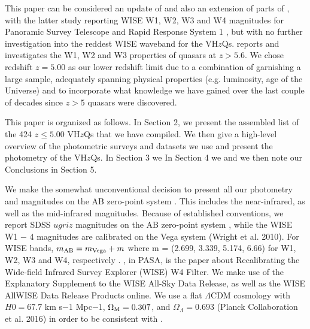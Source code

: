\documentclass[usenatbib]{mnras}
\begin{document}
This paper can be considered an update of \citet{Blain2013} and also
an extension of parts of \citet{Banados2016}, with the latter study
reporting WISE W1, W2, W3 and W4 magnitudes for Panoramic Survey
Telescope and Rapid Response System 1 \citep[Pan-STARRS1,
PS1;][]{Kaiser2002, Kaiser2010}, but with no further investigation
into the reddest WISE waveband for the VH$z$Qs.  \citet{Banados2016}
reports and investigates the W1, W2 and W3 properties of quasars at $z
> 5.6$. We chose redshift $z=5.00$ as our lower redshift limit due to
a combination of garnishing a large sample, adequately spanning
physical properties (e.g. luminosity, age of the Universe) and to
incorporate what knowledge we have gained over the last couple of
decades since $z>5$ quasars were discovered.

This paper is organized as follows.  In Section 2, we present the
assembled list of the 424 $z\leq5.00$ VH$z$Qs that we have
compiled. We then give a high-level overview of the photometric
surveys and datasets we use and present the photometry of the VH$z$Qs.
In Section 3 we In Section 4 we and we then note our Conclusions in
Section 5.

We make the somewhat unconventional decision to present all our
photometry and magnitudes on the AB zero-point system
\citep{Oke_Gunn1983, Fukugita1996}.  This includes the near-infrared,
as well as the mid-infrared magnitudes.  Because of established
conventions, we report SDSS $ugriz$ magnitudes on the AB zero-point
system \citep{Oke_Gunn1983, Fukugita1996}, while the WISE W1 − 4
magnitudes are calibrated on the Vega system (Wright et al. 2010). For
WISE bands, $m_{\rm AB} = m_{\rm Vega} + m$ where m = (2.699, 3.339,
5.174, 6.66) for W1, W2, W3 and W4, respectively \citep{Cutri2011,
Brown2014b}. \citet{Brown2014b}, in PASA, is the paper about
Recalibrating the Wide-field Infrared Survey Explorer (WISE) W4
Filter. We make use of the Explanatory Supplement to the WISE All-Sky
Data Release, as well as the WISE AllWISE Data Release Products
online.  We use a flat $\Lambda$CDM cosmology with $H0 = 67.7$ km
s$-1$ Mpc$−1$, $\Omega_{\rm M} = 0.307$, and $\Omega_{\Lambda} =
0.693$ (Planck Collaboration et al. 2016) in order to be consistent
with \citet{Banados2016}.


\end{document}
